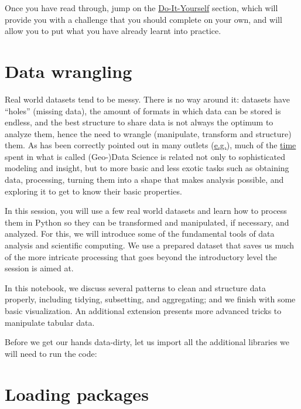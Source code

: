 \documentclass[
  letterpaper,
  DIV=11,
  numbers=noendperiod]{scrreprt}
\begin{document}
Once you have read through, jump on the
\href{https://pietrostefani.github.io/gds/openscienceDIY.html}{Do-It-Yourself}
section, which will provide you with a challenge that you should
complete on your own, and will allow you to put what you have already
learnt into practice.

\section*{Data wrangling}\label{data-wrangling}


Real world datasets tend to be messy. There is no way around it:
datasets have ``holes'' (missing data), the amount of formats in which
data can be stored is endless, and the best structure to share data is
not always the optimum to analyze them, hence the need to wrangle
(manipulate, transform and structure) them. As has been correctly
pointed out in many outlets
(\href{https://www.nytimes.com/2014/08/18/technology/for-big-data-scientists-hurdle-to-insights-is-janitor-work.html?_r=0}{e.g.}),
much of the
\href{https://twitter.com/BigDataBorat/status/306596352991830016}{time}
spent in what is called (Geo-)Data Science is related not only to
sophisticated modeling and insight, but to more basic and less exotic
tasks such as obtaining data, processing, turning them into a shape that
makes analysis possible, and exploring it to get to know their basic
properties.

In this session, you will use a few real world datasets and learn how to
process them in Python so they can be transformed and manipulated, if
necessary, and analyzed. For this, we will introduce some of the
fundamental tools of data analysis and scientific computing. We use a
prepared dataset that saves us much of the more intricate processing
that goes beyond the introductory level the session is aimed at.

In this notebook, we discuss several patterns to clean and structure
data properly, including tidying, subsetting, and aggregating; and we
finish with some basic visualization. An additional extension presents
more advanced tricks to manipulate tabular data.

Before we get our hands data-dirty, let us import all the additional
libraries we will need to run the code:

\section*{Loading packages}\label{loading-packages}
\end{document}
